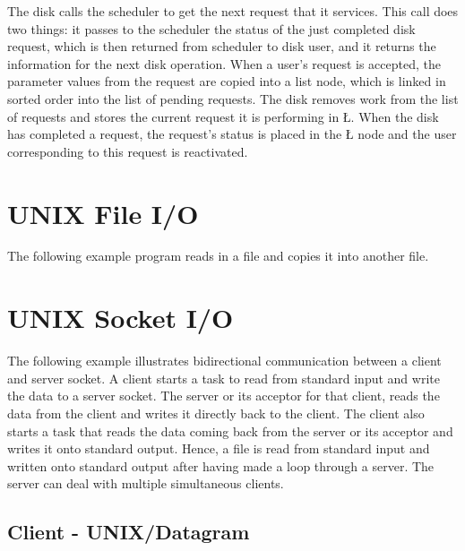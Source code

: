 \documentclass[openright,twoside]{report}
\begin{document}
The disk calls the scheduler to get the next request that it services.
This call does two things: it passes to the scheduler the status of the just completed disk request, which is then returned from scheduler to disk user, and it returns the information for the next disk operation.
When a user's request is accepted, the parameter values from the request are copied into a list node, which is linked in sorted order into the list of pending requests.
The disk removes work from the list of requests and stores the current request it is performing in \LGinlinetrue\LGbegin\lgrinde\L{}\endlgrinde\LGend{}.
When the disk has completed a request, the request's status is placed in the \LGinlinetrue\LGbegin\lgrinde\L{}\endlgrinde\LGend{} node and the user corresponding to this request is reactivated.



\section{UNIX File I/O}
\label{s:UNIXFileIO}

The following example program reads in a file and copies it into another file.



\section{UNIX Socket I/O}
\label{s:UNIXSocketIO}

The following example illustrates bidirectional communication between a client and server socket.
A client starts a task to read from standard input and write the data to a server socket.
The server or its acceptor for that client, reads the data from the client and writes it directly back to the client.
The client also starts a task that reads the data coming back from the server or its acceptor and writes it onto standard output.
Hence, a file is read from standard input and written onto standard output after having made a loop through a server.
The server can deal with multiple simultaneous clients.


\subsection{Client - UNIX/Datagram}
\label{s:ClientUNIXDatagram}

\end{document}
